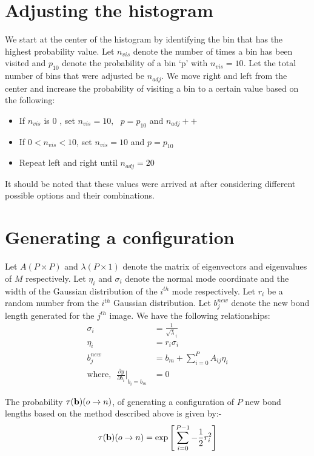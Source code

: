     \section{Adjusting the histogram}
        We start at the center of the histogram by identifying the bin that has the highest probability value. Let $n_{vis}$ denote the number of times a bin has been visited and $p_{10}$ denote the probability of a bin `p' with $n_{vis} = 10$. Let the total number of bins that were adjusted be $n_{adj}$. We move right and left from the center and increase the probability of visiting a bin to a certain value based on the following:
        \begin{itemize}
            \item If $n_{vis}$ is $0$ , set $n_{vis} = 10, \: \: \: p = p_{10}$ and $n_{adj}++$
            \item If $0 < n_{vis} < 10$, set $n_{vis} = 10$ and $p = p_{10}$
            \item Repeat left and right until $n_{adj} = 20$
        \end{itemize}

        It should be noted that these values were arrived at after considering different possible options and their combinations.

    \section{Generating a configuration}
        Let $A (P \times P)$ and $\lambda (P \times 1)$ denote the matrix of eigenvectors  and eigenvalues of $M$ respectively. Let $\eta_i$ and $\sigma_i$ denote the normal mode coordinate and the width of the Gaussian distribution of the $i^{th}$ mode respectively. Let $r_i$ be a random number from the $i^{th}$ Gaussian distribution. Let $b^{new}_j$ denote the new bond length generated for the $j^{th}$ image. We have the following relationships:
        \begin{equation}
            \begin{aligned}
                \sigma_i &= \frac{1}{\sqrt \lambda_i}\\
                \eta_i &= r_i  \sigma_i\\
                b_j^{new} &= b_m + \displaystyle\sum\limits_{i=0}^P A_{ij}  \eta_i\\
                \text{where,} \: \: \: {\frac{\partial y}{\partial b_i} \Bigg|}_{b_i = b_m} &= 0
            \end{aligned}
        \end{equation}

        The probability $\tau({\mathbf {b}}) (o \to n)$, of generating a configuration of $P$ new bond lengths based on the method described above is given by:-
        \begin{equation}
            \tau ({\mathbf {b}}) (o \to n) = \exp \Bigg[ \displaystyle\sum\limits_{i=0}^{P-1} - \frac{1}{2}  r_i^2 \Bigg]
        \end{equation}
